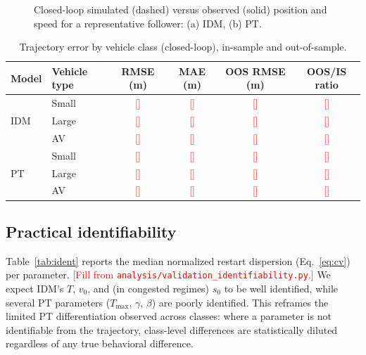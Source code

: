 \documentclass[11pt]{article}
\newcommand{\tbd}[1]{\textcolor{red}{[#1]}}        %
\begin{document}
\begin{figure}[t]
\centering
\fbox{\begin{minipage}[c][3.2cm][c]{0.46\textwidth}\centering
\tbd{(a) IDM example follower plot}\end{minipage}}\hfill
\fbox{\begin{minipage}[c][3.2cm][c]{0.46\textwidth}\centering
\tbd{(b) PT example follower plot}\end{minipage}}
\caption{Closed-loop simulated (dashed) versus observed (solid) position and
speed for a representative follower: (a) IDM, (b) PT.}
\label{fig:fit}
\end{figure}

\begin{table}[t]
\centering
\caption{Trajectory error by vehicle class (closed-loop), in-sample and
out-of-sample.}
\label{tab:err}
\begin{tabular}{llcccc}
\toprule
Model & Vehicle type & RMSE (m) & MAE (m) & OOS RMSE (m) & OOS/IS ratio\\
\midrule
\multirow{3}{*}{IDM} & Small & \tbd{} & \tbd{} & \tbd{} & \tbd{}\\
 & Large & \tbd{} & \tbd{} & \tbd{} & \tbd{}\\
 & AV    & \tbd{} & \tbd{} & \tbd{} & \tbd{}\\
\midrule
\multirow{3}{*}{PT} & Small & \tbd{} & \tbd{} & \tbd{} & \tbd{}\\
 & Large & \tbd{} & \tbd{} & \tbd{} & \tbd{}\\
 & AV    & \tbd{} & \tbd{} & \tbd{} & \tbd{}\\
\bottomrule
\end{tabular}
\end{table}

\subsection{Practical identifiability}
Table~\ref{tab:ident} reports the median normalized restart dispersion
(Eq.~\ref{eq:cv}) per parameter. \tbd{Fill from
\texttt{analysis/validation\_identifiability.py}.} We expect IDM's $T$, $v_0$,
and (in congested regimes) $s_0$ to be well identified, while several PT
parameters ($T_{\max}$, $\gamma$, $\beta$) are poorly identified. This reframes
the limited PT differentiation observed across classes: where a parameter is not
identifiable from the trajectory, class-level differences are statistically
diluted regardless of any true behavioral difference.
\end{document}
